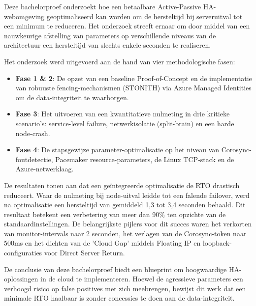 Deze bachelorproef onderzoekt hoe een betaalbare Active-Passive HA-webomgeving geoptimaliseerd kan worden om de hersteltijd bij serveruitval tot een minimum te reduceren. Het onderzoek streeft ernaar om door middel van een nauwkeurige afstelling van parameters op verschillende niveaus van de architectuur een hersteltijd van slechts enkele seconden te realiseren.
\medskip

Het onderzoek werd uitgevoerd aan de hand van vier methodologische fasen:
\begin{itemize}
    \item \textbf{Fase 1 \& 2}: De opzet van een baseline Proof-of-Concept en de implementatie van robuuste fencing-mechanismen (STONITH) via Azure Managed Identities om de data-integriteit te waarborgen.
    \item \textbf{Fase 3}: Het uitvoeren van een kwantitatieve nulmeting in drie kritieke scenario's: service-level failure, netwerkisolatie (split-brain) en een harde node-crash.
    \item \textbf{Fase 4}: De stapsgewijze parameter-optimalisatie op het niveau van Corosync-foutdetectie, Pacemaker resource-parameters, de Linux TCP-stack en de Azure-netwerklaag.
\end{itemize}

De resultaten tonen aan dat een geïntegreerde optimalisatie de RTO drastisch reduceert. Waar de nulmeting bij node-uitval leidde tot een falende failover, werd na optimalisatie een hersteltijd van gemiddeld 1,3 tot 3,4 seconden behaald. Dit resultaat betekent een verbetering van meer dan 90\% ten opzichte van de standaardinstellingen. De belangrijkste pijlers voor dit succes waren het verkorten van monitor-intervals naar 2 seconden, het verlagen van de Corosync-token naar 500ms en het dichten van de 'Cloud Gap' middels Floating IP en loopback-configuraties voor Direct Server Return.
\medskip

De conclusie van deze bachelorproef biedt een blueprint om hoogwaardige HA-oplossingen in de cloud te implementeren. Hoewel de agressieve parameters een verhoogd risico op false positives met zich meebrengen, bewijst dit werk dat een minimale RTO haalbaar is zonder concessies te doen aan de data-integriteit.
